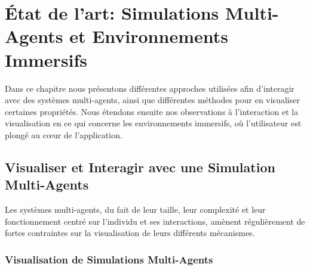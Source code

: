 \chapter{État de l'art: Simulations Multi-Agents et Environnements Immersifs}
\label{ChapitreEAVR}

	Dans ce chapitre nous présentons différentes approches utilisées afin d'interagir avec des systèmes multi-agents, ainsi que différentes méthodes pour en visualiser certaines propriétés. Nous étendons ensuite nos observations à l'interaction et la visualisation en ce qui concerne les environnements immersifs, où l'utilisateur est plongé au cœur de l'application.
	

	\section{Visualiser et Interagir avec une Simulation Multi-Agents}
		
	Les systèmes multi-agents, du fait de leur taille, leur complexité et leur fonctionnement centré sur l'individu et ses interactions, amènent régulièrement de fortes contraintes sur la visualisation de leurs différents mécanismes.		
		
		\subsection{Visualisation de Simulations Multi-Agents}
		
